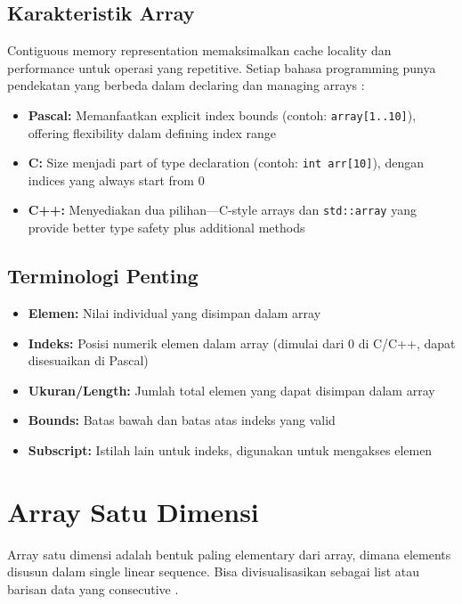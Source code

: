 \documentclass[../main.tex]{subfiles}
\begin{document}
\subsection{Karakteristik Array}
Contiguous memory representation memaksimalkan cache locality dan performance untuk operasi yang repetitive. Setiap bahasa programming punya pendekatan yang berbeda dalam declaring dan managing arrays \parencite{pascal-tutorial-wikibooks,cpp-std-array,cplusplus-arrays,tambahpinter-array}:

\begin{itemize}
  \item \textbf{Pascal:} Memanfaatkan explicit index bounds (contoh: \texttt{array[1..10]}), offering flexibility dalam defining index range
  \item \textbf{C:} Size menjadi part of type declaration (contoh: \texttt{int arr[10]}), dengan indices yang always start from 0
  \item \textbf{C++:} Menyediakan dua pilihan—C-style arrays dan \texttt{std::array} yang provide better type safety plus additional methods
\end{itemize}

\subsection{Terminologi Penting}
\begin{itemize}
  \item \textbf{Elemen:} Nilai individual yang disimpan dalam array
  \item \textbf{Indeks:} Posisi numerik elemen dalam array (dimulai dari 0 di C/C++, dapat disesuaikan di Pascal)
  \item \textbf{Ukuran/Length:} Jumlah total elemen yang dapat disimpan dalam array
  \item \textbf{Bounds:} Batas bawah dan batas atas indeks yang valid
  \item \textbf{Subscript:} Istilah lain untuk indeks, digunakan untuk mengakses elemen
\end{itemize}

\section{Array Satu Dimensi}

Array satu dimensi adalah bentuk paling elementary dari array, dimana elements disusun dalam single linear sequence. Bisa divisualisasikan sebagai list atau barisan data yang consecutive \parencite{tutorialspoint-c-arrays,galuhratna-array-c}.
\end{document}
